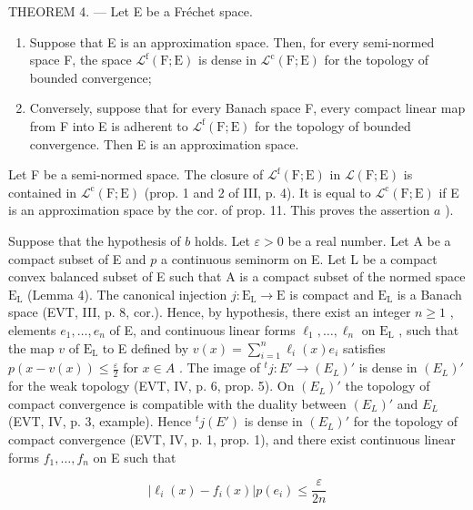 THEOREM 4. --- Let E be a Fréchet space.

\begin{enumerate}
\def\labelenumi{\alph{enumi})}
\item
  Suppose that E is an approximation space. Then, for every semi-normed space F, the space \(\mathcal{L}^{\mathrm{f}}(\mathrm{F};\mathrm{E})\) is dense in \(\mathcal{L}^{\mathrm{c}}(\mathrm{F};\mathrm{E})\) for the topology of bounded convergence;
\item
  Conversely, suppose that for every Banach space F, every compact linear map from F into E is adherent to \(\mathcal{L}^{\mathrm{f}}(\mathrm{F};\mathrm{E})\) for the topology of bounded convergence. Then E is an approximation space.
\end{enumerate}

Let F be a semi-normed space. The closure of \(\mathcal{L}^{\mathrm{f}}(\mathrm{F};\mathrm{E})\) in \(\mathcal{L}(\mathrm{F};\mathrm{E})\) is contained in \(\mathcal{L}^{\mathrm{c}}(\mathrm{F};\mathrm{E})\) (prop. 1 and 2 of III, p. 4). It is equal to \(\mathcal{L}^{\mathrm{c}}(\mathrm{F};\mathrm{E})\) if E is an approximation space by the cor. of prop. 11. This proves the assertion \(a\) ).

Suppose that the hypothesis of \(b\) holds. Let \(\varepsilon > 0\) be a real number. Let A be a compact subset of E and \(p\) a continuous seminorm on E. Let L be a compact convex balanced subset of E such that A is a compact subset of the normed space \(\mathrm{E_L}\) (Lemma 4). The canonical injection \(j: \mathrm{E_L} \to \mathrm{E}\) is compact and \(\mathrm{E_L}\) is a Banach space (EVT, III, p. 8, cor.). Hence, by hypothesis, there exist an integer \(n \geqslant 1\) , elements \(e_1, \ldots, e_n\) of E, and continuous linear forms \(\ell_1, \ldots, \ell_n\) on \(\mathrm{E_L}\) , such that the map \(v\) of \(\mathrm{E_L}\) to E defined by \(v(x) = \sum_{i=1}^{n} \ell_i(x)e_i\) satisfies \(p(x - v(x)) \leqslant \frac{\varepsilon}{2}\) for \(x \in A\) . The image of \({}^{t}j: E' \to (E_{L})'\) is dense in \((E_{L})'\) for the weak topology (EVT, IV, p. 6, prop. 5). On \((E_{L})'\) the topology of compact convergence is compatible with the duality between \((E_{L})'\) and \(E_{L}\) (EVT, IV, p. 3, example). Hence \({}^{t}j(E')\) is dense in \((E_{L})'\) for the topology of compact convergence (EVT, IV, p. 1, prop. 1), and there exist continuous linear forms \(f_{1}, \ldots, f_{n}\) on E such that

\[
| \ell_ {i} (x) - f _ {i} (x) | p (e _ {i}) \leqslant \frac {\varepsilon}{2 n}
\]

